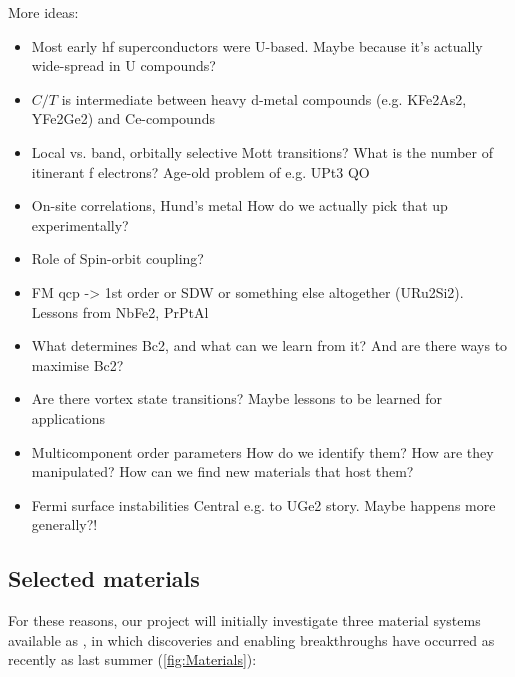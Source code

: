 More ideas: \\
\begin{itemize}
  \item Most early hf superconductors were U-based. Maybe because it's actually wide-spread in U compounds? 

\item $C/T$ is intermediate between heavy d-metal compounds (e.g. KFe2As2, YFe2Ge2) and Ce-compounds

\item
Local vs. band, orbitally selective Mott transitions? What is the number of itinerant f electrons? 
Age-old problem of e.g. UPt3 QO

\item 
On-site correlations, Hund's metal 
How do we actually pick that up experimentally?

\item
Role of Spin-orbit coupling?

\item 
FM qcp -> 1st order or SDW or something else altogether (URu2Si2). 
Lessons from NbFe2, PrPtAl

\item 
What determines Bc2, and what can we learn from it? 
And are there ways to maximise Bc2?

\item 
Are there vortex state transitions?
Maybe lessons to be learned for applications

\item 
Multicomponent order parameters
How do we identify them? How are they manipulated? How can we find new materials that host them?

\item 
Fermi surface instabilities
Central e.g. to UGe2 story. Maybe happens more generally?!
\end{itemize}

\subsection*{Selected materials}
\noindent
For these reasons, our project will initially investigate three material systems available as , in which discoveries and enabling breakthroughs %
have occurred as recently as last summer (\autoref{fig:Materials}):

